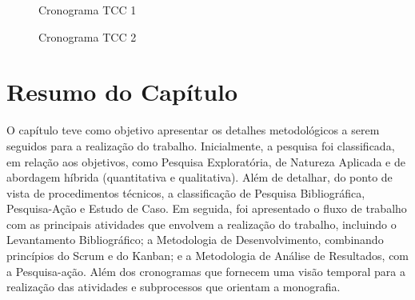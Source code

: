 \begin{figure}[h!]
	\centering
	\caption{Cronograma TCC 1}
	\label{fig06}
\end{figure}

\begin{figure}[h!]
	\centering
	\caption{Cronograma TCC 2}
	\label{fig07}
\end{figure}

\section{Resumo do Capítulo}
\label{sec:Resumo do Capitulo}
O capítulo teve como objetivo apresentar os detalhes metodológicos a serem seguidos para a realização do trabalho. Inicialmente, a pesquisa foi classificada, em relação aos objetivos, como Pesquisa Exploratória, de Natureza Aplicada 
e de abordagem híbrida (quantitativa e qualitativa). Além de detalhar, do ponto de vista de procedimentos técnicos, a classificação de Pesquisa Bibliográfica, Pesquisa-Ação e Estudo de Caso. Em seguida, foi apresentado o fluxo de trabalho 
com as principais atividades que envolvem a realização do trabalho, incluindo o Levantamento Bibliográfico; a Metodologia de Desenvolvimento, combinando princípios do Scrum e do Kanban; e a 
Metodologia de Análise de Resultados, com a Pesquisa-ação. Além dos cronogramas que fornecem uma visão temporal para a realização das atividades e subprocessos que orientam a monografia.